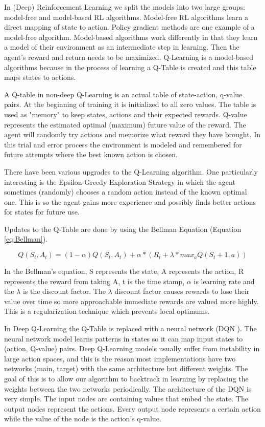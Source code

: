 \documentclass[b5paper]{book}
\let\cite\parencite
\begin{document}
In (Deep) Reinforcement Learning we split the models into two large groups: model-free and model-based RL algorithms. Model-free RL algorithms learn a direct mapping of state to action. Policy gradient methods are one example of a model-free algorithm. Model-based algorithms work differently in that they learn a model of their environment as an intermediate step in learning. Then the agent's reward and return needs to be maximized. Q-Learning is a model-based algorithms because in the process of learning a Q-Table is created and this table maps states to actions.

A Q-table in non-deep Q-Learning is an actual table of state-action, q-value pairs. At the beginning of training it is initialized to all zero values. The table is used as "memory" to keep states, actions and their expected rewards. Q-value represents the estimated optimal (maximum) future value of the reward. The agent will randomly try actions and memorize what reward they have brought. In this trial and error process the environment is modeled and remembered for future attempts where the best known action is chosen.

There have been various upgrades to the Q-Learning algorithm. One particularly interesting is the Epsilon-Greedy Exploration Strategy in which the agent sometimes (randomly) chooses a random action instead of the known optimal one. This is so the agent gains more experience and possibly finds better actions for states for future use.

Updates to the Q-Table are done by using the Bellman Equation \cite{baird1999gradient} (Equation \ref{eq:Bellman}).

\begin{equation}
\label{eq:Bellman}
Q(S_t, A_t) = (1 - \alpha) Q(S_t, A_t) + \alpha * (R_t + \lambda * max_a Q(S_t+1, a))
\end{equation}

In the Bellman's equation, S represents the state, A represents the action, R represents the reward from taking A, t is the time stamp, \(\alpha\) is learning rate and the \(\lambda\) is the discount factor. The \(\lambda\) discount factor causes rewards to lose their value over time so more approachable immediate rewards are valued more highly. This is a regularization technique which prevents local optimums.

In Deep Q-Learning the Q-Table is replaced with a neural network (DQN \cite{mnih2013playing}). The neural network model learns patterns in states so it can map input states to (action, Q-value) pairs. Deep Q-Learning models usually suffer from instability in large action spaces, and this is the reason most implementations have two networks (main, target) with the same architecture but different weights. The goal of this is to allow our algorithm to backtrack in learning by replacing the weights between the two networks periodically. The architecture of the DQN is very simple. The input nodes are containing values that embed the state. The output nodes represent the actions. Every output node represents a certain action while the value of the node is the action's q-value. 
\end{document}
